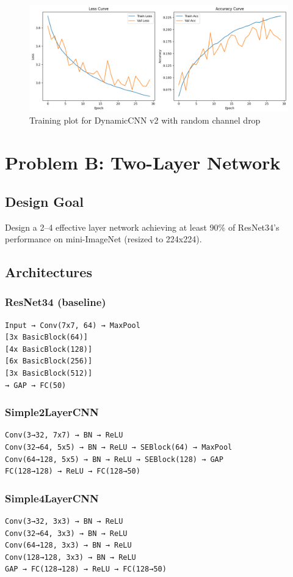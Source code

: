 \documentclass[12pt]{article}
\begin{document}
\begin{figure}[H]
\centering
\includegraphics[width=0.8\linewidth]{results/Dynamic2_drop.png}
\caption{Training plot for DynamicCNN v2 with random channel drop}
\end{figure}

\section*{Problem B: Two-Layer Network}

\subsection*{Design Goal}
Design a 2--4 effective layer network achieving at least 90\% of ResNet34's performance on mini-ImageNet (resized to 224x224).

\subsection*{Architectures}

\subsubsection*{ResNet34 (baseline)}
\begin{Verbatim}
Input → Conv(7x7, 64) → MaxPool
[3x BasicBlock(64)]
[4x BasicBlock(128)]
[6x BasicBlock(256)]
[3x BasicBlock(512)]
→ GAP → FC(50)
\end{Verbatim}

\subsubsection*{Simple2LayerCNN}
\begin{Verbatim}
Conv(3→32, 7x7) → BN → ReLU
Conv(32→64, 5x5) → BN → ReLU → SEBlock(64) → MaxPool
Conv(64→128, 5x5) → BN → ReLU → SEBlock(128) → GAP
FC(128→128) → ReLU → FC(128→50)
\end{Verbatim}

\subsubsection*{Simple4LayerCNN}
\begin{Verbatim}
Conv(3→32, 3x3) → BN → ReLU
Conv(32→64, 3x3) → BN → ReLU
Conv(64→128, 3x3) → BN → ReLU
Conv(128→128, 3x3) → BN → ReLU
GAP → FC(128→128) → ReLU → FC(128→50)
\end{Verbatim}
\end{document}
